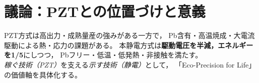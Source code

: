 \section{議論：PZTとの位置づけと意義}
PZT方式は高出力・成熟量産の強みがある一方で，
Pb含有・高温焼成・大電流駆動による熱・応力の課題がある。
本静電方式は\textbf{駆動電圧を半減，エネルギーを1/5}にしつつ，
Pbフリー・低温・低発熱・非接触を満たす。
\emph{稼ぐ技術（PZT）}を支える\emph{示す技術（静電）}として，
「Eco-Precision for Life」の価値軸を具体化する。
